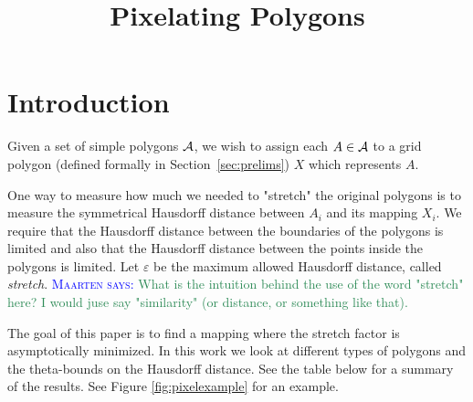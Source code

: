 \documentclass{paper}
\title{Pixelating Polygons}
\newcommand{\mremark}[3]{\textcolor{blue}{\textsc{#1 #2:}} \textcolor{SeaGreen}{\textsf{#3}}}
\newcommand{\maarten}[2][says]{\mremark{Maarten}{#1}{#2}}
\newcommand{\pix}{\resizebox{2mm}{2mm}{\square}}
\newcommand{\eps}{\varepsilon}
\begin{document}
\maketitle

\section{Introduction}

Given a set of simple polygons $\cal A$, we wish to assign each $A \in \cal A$ to a grid polygon (defined formally in Section~\ref {sec:prelims}) $X$ which represents $A$.




One way to measure how much we needed to "stretch" the original polygons is to measure the symmetrical Hausdorff distance between $A_i$ and its mapping $X_i$. 
We require that the Hausdorff distance between the boundaries of the polygons is limited and also that the Hausdorff distance between the points inside the polygons is limited.
Let $\eps$ be the maximum allowed Hausdorff distance, called \emph{stretch}.
\maarten {What is the intuition behind the use of the word "stretch" here? I would juse say "similarity" (or distance, or something like that).}

The goal of this paper is to find a mapping where the stretch factor is asymptotically minimized. In this work we look at different types of polygons and the theta-bounds on the Hausdorff distance. See the table below for a summary of the results.
See Figure \ref{fig:pixelexample} for an example.
\end{document}
